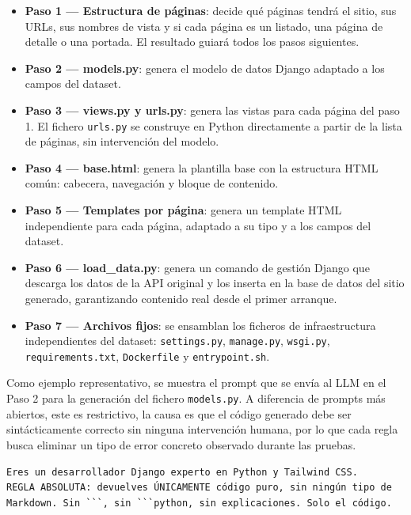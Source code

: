 \begin{itemize}
    \item \textbf{Paso 1 — Estructura de páginas}: decide qué páginas 
    tendrá el sitio, sus URLs, sus nombres de vista y si cada página es 
    un listado, una página de detalle o una portada. El resultado guiará 
    todos los pasos siguientes.
    
    \item \textbf{Paso 2 — models.py}: genera el modelo de datos Django 
    adaptado a los campos del dataset.
    
    \item \textbf{Paso 3 — views.py y urls.py}: genera las vistas para 
    cada página del paso 1. El fichero \texttt{urls.py} se construye en 
    Python directamente a partir de la lista de páginas, sin intervención 
    del modelo.
    
    \item \textbf{Paso 4 — base.html}: genera la plantilla base con la 
    estructura HTML común: cabecera, navegación y bloque de contenido.
    
    \item \textbf{Paso 5 — Templates por página}: genera un template HTML 
    independiente para cada página, adaptado a su tipo y a los campos del 
    dataset.
    
    \item \textbf{Paso 6 — load\_data.py}: genera un comando de gestión 
    Django que descarga los datos de la API original y los inserta en la 
    base de datos del sitio generado, garantizando contenido real desde 
    el primer arranque.
    
    \item \textbf{Paso 7 — Archivos fijos}: se ensamblan los ficheros de 
    infraestructura independientes del dataset: \texttt{settings.py}, 
    \texttt{manage.py}, \texttt{wsgi.py}, \texttt{requirements.txt}, 
    \texttt{Dockerfile} y \texttt{entrypoint.sh}.
\end{itemize}


Como ejemplo representativo, se muestra el prompt que se envía 
al LLM en el Paso 2 para la generación del fichero \texttt{models.py}. 
A diferencia de prompts más abiertos, este es restrictivo, la causa es que el código generado debe ser sintácticamente correcto sin ninguna intervención humana, por lo que cada regla busca eliminar un tipo 
de error concreto observado durante las pruebas.

\begin{lstlisting}[caption={Prompt de sistema para la generación de models.py}, 
label={lst:models-system}]
Eres un desarrollador Django experto en Python y Tailwind CSS.
REGLA ABSOLUTA: devuelves ÚNICAMENTE código puro, sin ningún tipo de 
Markdown. Sin ```, sin ```python, sin explicaciones. Solo el código.
\end{lstlisting}

